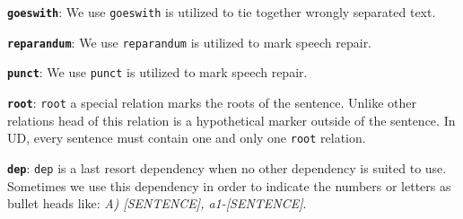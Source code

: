 \documentclass[11pt,a4paper]{article}
\begin{document}
\textbf{\texttt{goeswith}}:
We use \texttt{goeswith} is utilized to tie together wrongly separated text.

\textbf{\texttt{reparandum}}:
We use \texttt{reparandum} is utilized to mark speech repair.

\textbf{\texttt{punct}}:
We use \texttt{punct} is utilized to mark speech repair.

\textbf{\texttt{root}}:
\texttt{root} a special relation marks the roots of the sentence. Unlike other relations head of this relation is a hypothetical marker outside of the sentence. In UD, every sentence must contain one and only one \texttt{root} relation.

\textbf{\texttt{dep}}:
\texttt{dep} is a last resort dependency when no other dependency is suited to use. Sometimes we use this dependency in order to indicate the numbers or letters as bullet heads like: \textit{A) [SENTENCE], a1-[SENTENCE]}.



\end{document}
